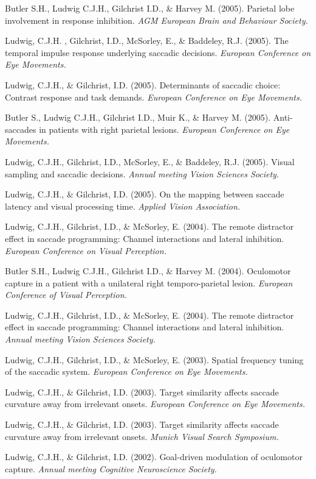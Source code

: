 \documentclass[a4paper, 10pt]{article}
\renewenvironment{itemize}{
  \begin{list}{}{
    \setlength{\leftmargin}{1.5em}
  }
}{
  \end{list}
}
\begin{document}
\begin{itemize}
\item Butler S.H., Ludwig C.J.H., Gilchrist I.D., \& Harvey M. (2005). Parietal lobe involvement in response inhibition. {\it AGM European Brain and Behaviour Society.}
\item Ludwig, C.J.H. , Gilchrist, I.D., McSorley, E., \& Baddeley, R.J. (2005). The temporal impulse response underlying saccadic decisions. {\it European Conference on Eye Movements.}
\item Ludwig, C.J.H., \& Gilchrist, I.D. (2005). Determinants of saccadic choice: Contrast response and task demands. {\it European Conference on Eye Movements.}
\item Butler S., Ludwig C.J.H., Gilchrist I.D., Muir K., \& Harvey M. (2005). Anti-saccades in patients with right parietal lesions. {\it European Conference on Eye Movements.}
\item Ludwig, C.J.H., Gilchrist, I.D., McSorley, E., \& Baddeley, R.J. (2005). Visual sampling and saccadic decisions. {\it Annual meeting Vision Sciences Society.}
\item Ludwig, C.J.H., \& Gilchrist, I.D. (2005). On the mapping between saccade latency and visual processing time. {\it Applied Vision Association.}
\item Ludwig, C.J.H., Gilchrist, I.D., \& McSorley, E. (2004). The remote distractor effect in saccade programming: Channel interactions and lateral inhibition. {\it European Conference on Visual Perception.}
\item Butler S.H., Ludwig C.J.H., Gilchrist I.D., \& Harvey M. (2004). Oculomotor capture in a patient with a unilateral right temporo-parietal lesion. {\it European Conference of Visual Perception.}
\item Ludwig, C.J.H., Gilchrist, I.D., \& McSorley, E. (2004). The remote distractor effect in saccade programming: Channel interactions and lateral inhibition. {\it Annual meeting Vision Sciences Society.}
\item Ludwig, C.J.H., Gilchrist, I.D., \& McSorley, E. (2003). Spatial frequency tuning of the saccadic system. {\it European Conference on Eye Movements.}
\item Ludwig, C.J.H., \& Gilchrist, I.D. (2003). Target similarity affects saccade curvature away from irrelevant onsets. {\it European Conference on Eye Movements.}
\item Ludwig, C.J.H., \& Gilchrist, I.D. (2003). Target similarity affects saccade curvature away from irrelevant onsets. {\it Munich Visual Search Symposium.}
\item Ludwig, C.J.H., \& Gilchrist, I.D. (2002). Goal-driven modulation of oculomotor capture. {\it Annual meeting Cognitive Neuroscience Society.}

\end{itemize}
\end{document}
